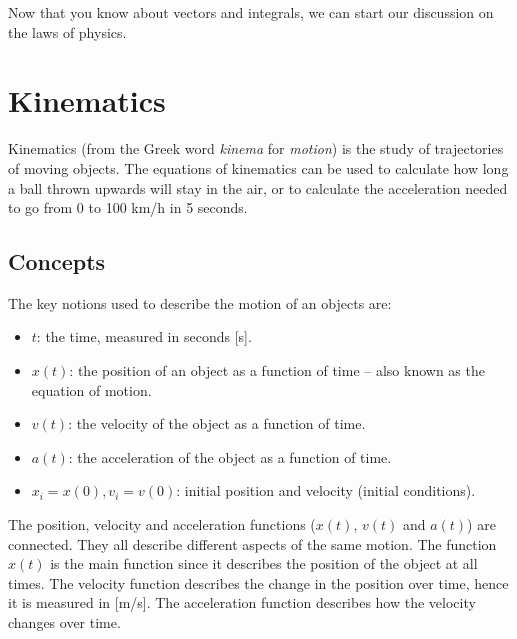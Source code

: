 \documentclass[letterpaper,9pt,journal]{IEEEtran}
\newcommand{\dokuitalic}[1]{\textsl{#1}}
\newcommand{\dokuitem}{\item}
\begin{document}
Now that you know about vectors and integrals, 
we can start our discussion on the laws of physics.


\section{Kinematics}
\label{508ac5264059de6a350383a9f1e87977}%
Kinematics (from the Greek word \dokuitalic{kinema} for \dokuitalic{motion}) is the study of 
trajectories of moving objects.  
The equations of kinematics can be used to calculate how long a ball thrown upwards will stay in the air, 
or to calculate the acceleration needed to go from 0 to 100 km/h in 5 seconds.

\vspace{-3mm}
\subsection{Concepts}
\label{408d82ccb63ca28fa1665f5ee146b453}%

The key notions used to describe the motion of an objects are:
\begin{itemize}
\dokuitem  $t$: the time, measured in seconds [s].
\dokuitem  $x(t)$: the position of an object as a function of time -- also known as the equation of motion. %
\dokuitem  $v(t)$: the velocity of the object as a function of time.%
\dokuitem  $a(t)$: the acceleration of the object as a function of time. %
\dokuitem  $x_i=x(0), v_i=v(0)$: initial position and velocity (initial conditions).
\end{itemize}

The position, velocity and acceleration functions ($x(t)$, $v(t)$ and $a(t)$) are connected. 
They all describe different aspects of the same motion.
The function $x(t)$ is the main function since it describes the position of the object at all times.
The velocity function describes the change in the position over time, hence it is measured in [m/s].
The acceleration function describes how the velocity changes over time.
\end{document}
